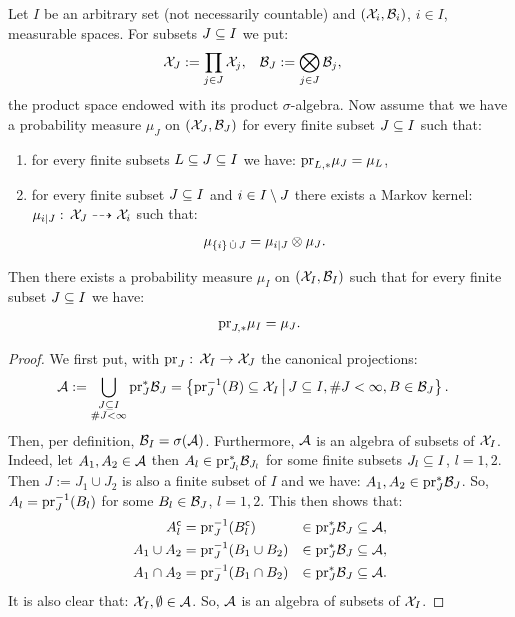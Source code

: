 \begin{Thm}
    \label{thm:ionescu-tulcea}
    Let $I$ be an arbitrary set (not necessarily countable) and $(\mathcal{X}_i,\mathcal{B}_i)$, $i \in I$, measurable spaces.
    For subsets $J \subseteq I$ we put:
    \begin{align}
        \mathcal{X}_J &:= \prod_{j \in J} \mathcal{X}_j, & \mathcal{B}_J&:= \bigotimes_{j \in J} \mathcal{B}_j,
    \end{align}
    the product space endowed with its product $\sigma$-algebra.
    Now assume that we have a probability measure $\mu_J$ on $(\mathcal{X}_J,\mathcal{B}_J)$ 
    for every finite subset $J \subseteq I$ such that:
    \begin{enumerate}
        \item for every finite subsets $L \subseteq J \subseteq I$ we have:
            $\mathrm{pr}_{L,*}\mu_J = \mu_L$,
        \item for every finite subset $J \subseteq I$ and $i \in I \setminus J$ there exists a Markov kernel: $\mu_{i|J}:\, \mathcal{X}_J \dashrightarrow \mathcal{X}_i$ such that:
            \begin{align}
                \mu_{\{ i \} \,\dot{\cup}\, J} &= \mu_{i|J} \otimes \mu_J.
            \end{align}
    \end{enumerate}
    Then there exists a probability measure $\mu_I$ on $(\mathcal{X}_I,\mathcal{B}_I)$ such that
    for every finite subset $J \subseteq I$ we have:
            \begin{align}
                \mathrm{pr}_{J,*}\mu_I = \mu_J.
            \end{align}
\begin{proof}
    We first put, with $\mathrm{pr}_J:\, \mathcal{X}_I \to \mathcal{X}_J$ the canonical projections:
    \begin{align}
        \mathcal{A} &:= \bigcup_{\substack{J \subseteq I\\ \#J < \infty}} \mathrm{pr}_J^*\mathcal{B}_J
        = \left \{ \mathrm{pr}_J^{-1}(B) \subseteq \mathcal{X}_I \,\middle|\, J \subseteq I, \#J < \infty, B \in \mathcal{B}_J \right \}.
    \end{align}
    Then, per definition, $\mathcal{B}_I = \sigma(\mathcal{A})$.
    Furthermore, $\mathcal{A}$ is an algebra of subsets of $\mathcal{X}_I$.
    Indeed, let $A_1,A_2 \in \mathcal{A}$ then $A_l \in \mathrm{pr}_{J_l}^{*}\mathcal{B}_{J_l}$ for some finite subsets $J_l \subseteq I$, $l=1,2$. Then $J:=J_1 \cup J_2$ is also a finite subset of $I$ and we have: $A_1, A_2 \in \mathrm{pr}_J^{*}\mathcal{B}_J$. So, 
    $A_l = \mathrm{pr}_J^{-1}(B_l)$ for some $B_l \in \mathcal{B}_J$, $l=1,2$.
    This then shows that:
    \begin{align}
        A_l^{\mathsf{c}} &= \mathrm{pr}_J^{-1}(B_l^{\mathsf{c}}) &\in \mathrm{pr}_J^{*}\mathcal{B}_J \subseteq \mathcal{A}, \\
        A_1 \cup A_2 &= \mathrm{pr}_J^{-1}(B_1 \cup B_2) &\in \mathrm{pr}_J^{*}\mathcal{B}_J \subseteq \mathcal{A}, \\
        A_1 \cap A_2 &= \mathrm{pr}_J^{-1}(B_1 \cap B_2) &\in \mathrm{pr}_J^{*}\mathcal{B}_J \subseteq \mathcal{A}.
    \end{align}
    It is also clear that: $\mathcal{X}_I,\emptyset \in \mathcal{A}$. 
    So, $\mathcal{A}$ is an algebra of subsets of $\mathcal{X}_I$.


\end{proof}
\end{Thm}
